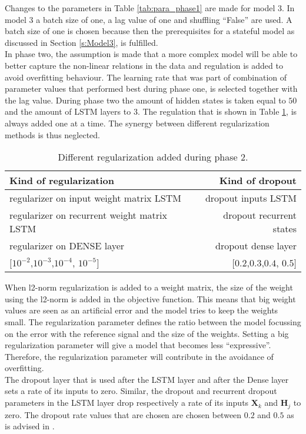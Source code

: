 Changes to the parameters in Table \ref{tab:para_phase1} are made for model $ 3 $. In model $ 3 $ a batch size of one, a lag value of one and shuffling ``False'' are used. A batch size of one is chosen because then the prerequisites for a stateful model as discussed in Section \ref{s:Model3}, is fulfilled.\\

In phase two, the assumption is made that a more complex model will be able to better capture the non-linear relations in the data and regulation is added to avoid overfitting behaviour. The learning rate that was part of combination of parameter values that performed best during phase one, is selected together with the lag value. During phase two the amount of hidden states is taken equal to $ 50 $ and the amount of LSTM layers to $ 3 $. The regulation that is shown in Table \ref{tab:regulation}, is always added one at a time. The synergy between different regularization methods is thus neglected. 

\begin{table}[ht]
	\centering
	\begin{tabular}{@{}l|r@{}} \toprule
		\textbf{Kind of regularization} & 	\textbf{Kind of dropout}\\\midrule
		regularizer on input weight matrix LSTM 	& dropout inputs LSTM\\\hline
		regularizer on recurrent weight matrix LSTM & dropout recurrent states\\\hline
		regularizer on DENSE layer & dropout dense layer\\\hline
		$[ 10^{-2} $,$ 10^{-3} $,$ 10^{-4}$, $ 10^{-5} ]$ & $[ 0.2 $,$ 0.3 $,$ 0.4$, $ 0.5 ]$\\\bottomrule
\end{tabular}
\caption{Different regularization added during phase 2.}
\label{tab:regulation}
\end{table}


When l2-norm regularization is added to a weight matrix, the size of the weight using the l2-norm is added in the objective function. This means that big weight values are seen as an artificial error and the model tries to keep the weights small. The regularization parameter defines the ratio between the model focussing on the error with the reference signal and the size of the weights. Setting a big regularization parameter will give a model that becomes less ``expressive''. Therefore, the regularization parameter will contribute in the avoidance of overfitting.\\ 
The dropout layer that is used after the LSTM layer and after the Dense layer sets a rate of its inputs to zero. Similar, the dropout and recurrent dropout parameters in the LSTM layer drop respectively a rate of its inputs $ \bm{X}_{k} $ and $ \bm{H}_{j} $ to zero. The dropout rate values that are chosen are chosen between $ 0.2 $ and $ 0.5 $ as is advised in \cite{Mele1993}.\\

